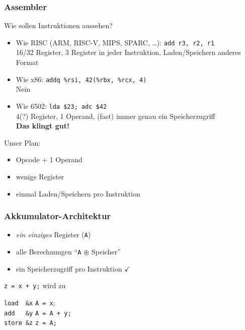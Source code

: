 \documentclass[t,aspectratio=169]{beamer}
\begin{document}
\begin{frame}
  \frametitle{Assembler}

  Wie sollen Instruktionen aussehen?
  \begin{itemize}
  \item Wie RISC (ARM, RISC-V, MIPS, SPARC, \ldots): \texttt{add r3, r2, r1}\\
    16/32 Register, 3 Register in jeder Instruktion, Laden/Speichern anderes Format
  \item Wie x86: \texttt{addq \%rsi, 42(\%rbx, \%rcx, 4)}\\
    Nein
  \item Wie 6502: \texttt{lda \$23; adc \$42}\\
    4(?) Register, 1 Operand, (fast) immer genau ein Speicherzugriff\\
    \pause
    \textbf{Das klingt gut!}
  \end{itemize}

  \bigskip

  Unser Plan:
  \begin{itemize}
  \item Opcode + 1 Operand
  \item wenige Register
  \item einmal Laden/Speichern pro Instruktion
  \end{itemize}

\end{frame}

\begin{frame}
  \frametitle{Akkumulator-Architektur}

  \begin{itemize}
  \item \emph{ein einziges} Register (\texttt{A})
  \item alle Berechnungen \enquote{\texttt{A} $\circledast$ Speicher}
  \item ein Speicherzugriff pro Instruktion $\checkmark$
  \end{itemize}

  \bigskip

  \texttt{z = x + y;} wird zu

  \bigskip

  {\Large
    \texttt{load~~\&x} \qquad \texttt{A = x};\\
    \texttt{add~~~\&y} \qquad \texttt{A = A + y;}\\
    \texttt{store~\&z} \qquad \texttt{z = A;}\\
  }
\end{frame}
\end{document}
